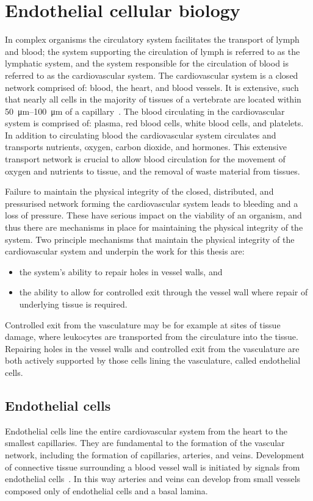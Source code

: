 \section{Endothelial cellular biology}
\label{introduction:endothelial_cellular_biology} 
In complex organisms the circulatory system facilitates the transport of lymph and blood; the system supporting the circulation of lymph is referred to as the lymphatic system, and the system responsible for the circulation of blood is referred to as the cardiovascular system. The cardiovascular system is a closed network comprised of: blood, the heart, and blood vessels. It is extensive, such that nearly all cells in the majority of tissues of a vertebrate are located within \SIrange{50}{100}{\micro\meter} of a capillary~\cite{Alberts2002}. The blood circulating in the cardiovascular system is comprised of: plasma, red blood cells, white blood cells, and platelets. In addition to circulating blood the cardiovascular system circulates and transports nutrients, oxygen, carbon dioxide, and hormones. This extensive transport network is crucial to allow blood circulation for the movement of oxygen and nutrients to tissue, and the removal of waste material from tissues.

Failure to maintain the physical integrity of the closed, distributed, and pressurised network forming the cardiovascular system leads to bleeding and a loss of pressure. These have serious impact on the viability of an organism, and thus there are mechanisms in place for maintaining the physical integrity of the system. Two principle mechanisms that maintain the physical integrity of the cardiovascular system and underpin the work for this thesis are:
\begin{itemize}
    \item the system's ability to repair holes in vessel walls, and
    \item the ability to allow for controlled exit through the vessel wall where repair of underlying tissue is required.
\end{itemize}
Controlled exit from the vasculature may be for example at sites of tissue damage, where leukocytes are transported from the circulature into the tissue. Repairing holes in the vessel walls and controlled exit from the vasculature are both actively supported by those cells lining the vasculature, called endothelial cells.

\subsection{Endothelial cells}
\label{introduction:endothelial_cellular_biology:endothelial_cells}
Endothelial cells line the entire cardiovascular system from the heart to the smallest capillaries. They are fundamental to the formation of the vascular network, including the formation of capillaries, arteries, and veins. Development of connective tissue surrounding a blood vessel wall is initiated by signals from endothelial cells~\cite{Alberts2002}. In this way arteries and veins can develop from small vessels composed only of endothelial cells and a basal lamina.

